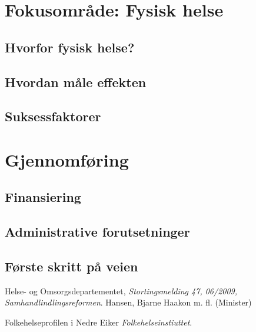 \documentclass[11pt]{memoir} %
\begin{document}
\chapter{Fokusområde: Fysisk helse}
	\section{Hvorfor fysisk helse?}
	\section{Hvordan måle effekten}
	\section{Suksessfaktorer}


\chapter{Gjennomføring}
	\section{Finansiering}
	\section{Administrative forutsetninger}
	\section{Første skritt på veien}

 \renewcommand{\bibname}{Kilder:}
              \begin{thebibliography}{99}

                  Helse- og Omsorgsdepartementet,
                  \emph{Stortingsmelding 47, 06/2009, Samhandlindlingsreformen}.
                  Hansen, Bjarne Haakon m. fl. (Minister)

                  Folkehelseprofilen i Nedre Eiker
                  \emph{Folkehelseinstiuttet}.
                  

\end{thebibliography}
\end{document}
